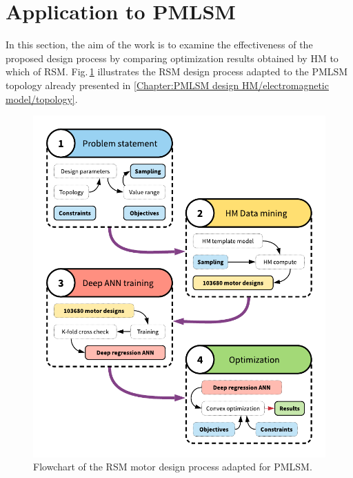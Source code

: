     \section{Application to \ac{PMLSM}}             \label{Chapter:RSM/PMLSM}
    
        
        In this section, the aim of the work is to examine the effectiveness of the proposed design process by comparing optimization results obtained by \acs{HM} to which of \acs{RSM}. Fig.\,\ref{fig:chapter/rsm/PMLSM optimization} illustrates the \acs{RSM} design process adapted to the \acs{PMLSM} topology already presented in \ref{Chapter:PMLSM design HM/electromagnetic model/topology}. 
        
        
        \begin{figure}[h]
            \centering
            \includegraphics[width=5in]{chap4/images/optimization_process_RSM_for_PMLSM.pdf}
            \caption{Flowchart of the RSM motor design process adapted for PMLSM.}
            \label{fig:chapter/rsm/PMLSM optimization}
        \end{figure}
        
